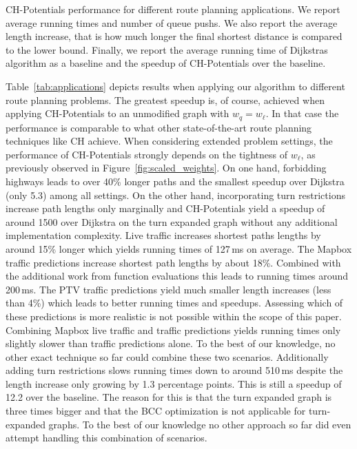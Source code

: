 \documentclass[letterpaper]{article} %
\begin{document}
\begin{table}
\centering
\caption{
CH-Potentials performance for different route planning applications.
We report average running times and number of queue pushs.
We also report the average length increase, that is how much longer the final shortest distance is compared to the lower bound.
Finally, we report the average running time of Dijkstras algorithm as a baseline and the speedup of CH-Potentials over the baseline.
}\label{tab:applications}

\end{table}

Table~\ref{tab:applications} depicts results when applying our algorithm to different route planning problems.
The greatest speedup is, of course, achieved when applying CH-Potentials to an unmodified graph with $w_q = w_\ell$.
In that case the performance is comparable to what other state-of-the-art route planning techniques like CH achieve.
When considering extended problem settings, the performance of CH-Potentials strongly depends on the tightness of $w_\ell$, as previously observed in Figure~\ref{fig:scaled_weights}.
On one hand, forbidding highways leads to over 40\% longer paths and the smallest speedup over Dijkstra (only 5.3) among all settings.
On the other hand, incorporating turn restrictions increase path lengths only marginally and CH-Potentials yield a speedup of around 1500 over Dijkstra on the turn expanded graph without any additional implementation complexity.
Live traffic increases shortest paths lengths by around 15\% longer which yields running times of 127\,ms on average.
The Mapbox traffic predictions increase shortest path lengths by about 18\%.
Combined with the additional work from function evaluations this leads to running times around 200\,ms.
The PTV traffic predictions yield much smaller length increases (less than 4\%) which leads to better running times and speedups.
Assessing which of these predictions is more realistic is not possible within the scope of this paper.
Combining Mapbox live traffic and traffic predictions yields running times only slightly slower than traffic predictions alone.
To the best of our knowledge, no other exact technique so far could combine these two scenarios.
Additionally adding turn restrictions slows running times down to around 510\,ms despite the length increase only growing by 1.3 percentage points.
This is still a speedup of 12.2 over the baseline.
The reason for this is that the turn expanded graph is three times bigger and that the BCC optimization is not applicable for turn-expanded graphs.
To the best of our knowledge no other approach so far did even attempt handling this combination of scenarios.
\end{document}
